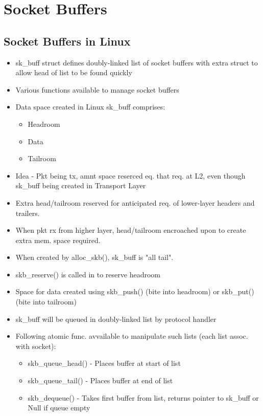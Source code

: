\section{Socket Buffers}

\subsection{Socket Buffers in Linux}

\begin{itemize}
	\item sk\_buff struct defines doubly-linked list of socket buffers with
		extra struct to allow head of list to be found quickly
	\item Various functions available to manage socket buffers
	\item Data space created in Linux sk\_buff comprises:
	\begin{itemize}
		\item Headroom
		\item Data
		\item Tailroom
	\end{itemize}
	\item Idea - Pkt being tx, amnt space reserced eq. that req. at L2, even
		though sk\_buff being created in Transport Layer
	\item Extra head/tailroom reserved for anticipated req. of lower-layer
		headers and trailers.
	\item When pkt rx from higher layer, head/tailroom encroached upon to
		create extra mem. space required.
	\item When created by alloc\_skb(), sk\_buff is "all tail".
	\item skb\_reserve() is called in to reserve headroom
	\item Space for data created using skb\_push() (bite into headroom) or
		skb\_put() (bite into tailroom)
	\item sk\_buff will be queued in doubly-linked list by protocol handler
	\item Following atomic func. avvailable to manipulate such lists (each
		list assoc. with socket):
	\begin{itemize}
		\item skb\_queue\_head() - Places buffer at start of list
		\item skb\_queue\_tail() - Places buffer at end of list
		\item skb\_dequeue() - Takes first buffer from list, returns
			pointer to sk\_buff or Null if queue empty

\end{itemize}
\end{itemize}

